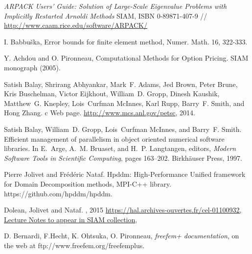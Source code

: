 \documentclass[a4paper,twoside,12pt]{book}
\begin{document}
\begin{thebibliography}{xx}

{\it ARPACK Users' Guide: Solution of Large-Scale Eigenvalue Problems with Implicitly Restarted Arnoldi Methods}
SIAM,  ISBN 0-89871-407-9 //
 \url{http://www.caam.rice.edu/software/ARPACK/}

{\sc I. Babbu\v{s}ka}, Error bounds for finite element method, Numer. Math. 16, 322-333.

 {\sc Y. Achdou and O. Pironneau}, Computational Methods for Option Pricing.  SIAM monograph (2005).


Satish Balay, Shrirang Abhyankar, Mark~F. Adams, Jed Brown, Peter Brune, Kris
  Buschelman, Victor Eijkhout, William~D. Gropp, Dinesh Kaushik, Matthew~G.
  Knepley, Lois~Curfman McInnes, Karl Rupp, Barry~F. Smith, and Hong Zhang.
c {W}eb page.
\newblock \url{http://www.mcs.anl.gov/petsc}, 2014.

Satish Balay, William~D. Gropp, Lois~Curfman McInnes, and Barry~F. Smith.
\newblock Efficient management of parallelism in object oriented numerical
  software libraries.
\newblock In E.~Arge, A.~M. Bruaset, and H.~P. Langtangen, editors, {\em Modern
  Software Tools in Scientific Computing}, pages 163--202. Birkh{\"{a}}user
  Press, 1997.


Pierre Jolivet and Fr\'ed\'eric Nataf.
\newblock Hpddm: {High-Performance Unified framework for Domain Decomposition
  methods, MPI-C++ library}.
\newblock https://github.com/hpddm/hpddm.


Dolean, Jolivet and Nataf. 
, {2015}
\newblock  \url{https://hal.archives-ouvertes.fr/cel-01100932, Lecture Notes to appear in SIAM collection},



 {\sc D. Bernardi, F.Hecht, K. Ohtsuka, O. Pironneau}, {\it
freefem+ documentation}, on the web at  ftp://www.freefem.org/freefemplus.


\end{thebibliography}
\end{document}

